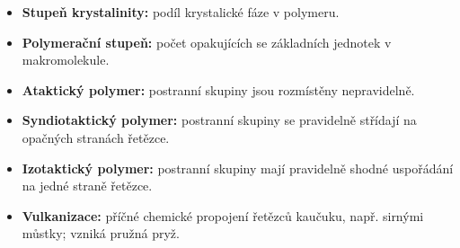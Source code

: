 \begin{itemize}
\item \textbf{Stupeň krystalinity:} podíl krystalické fáze v polymeru.
\item \textbf{Polymerační stupeň:} počet opakujících se základních jednotek v makromolekule.
\item \textbf{Ataktický polymer:} postranní skupiny jsou rozmístěny nepravidelně.
\item \textbf{Syndiotaktický polymer:} postranní skupiny se pravidelně střídají na opačných stranách řetězce.
\item \textbf{Izotaktický polymer:} postranní skupiny mají pravidelně shodné uspořádání na jedné straně řetězce.
\item \textbf{Vulkanizace:} příčné chemické propojení řetězců kaučuku, např. sirnými můstky; vzniká pružná pryž.
\end{itemize}
